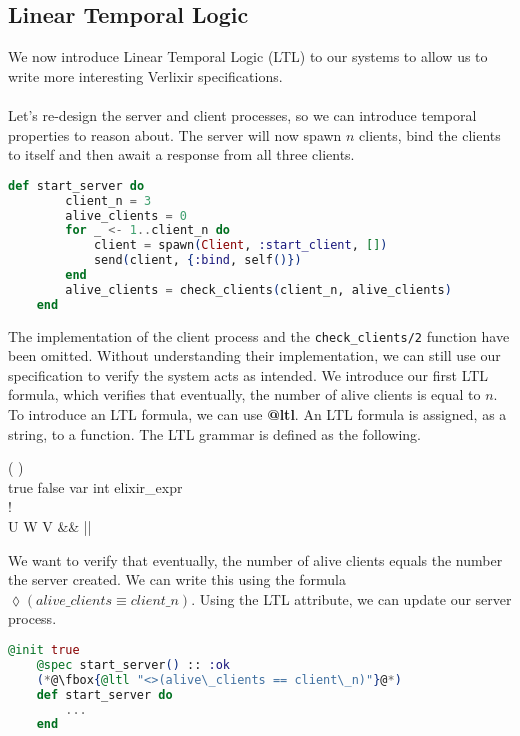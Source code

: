 \subsection{Linear Temporal Logic}
We now introduce Linear Temporal Logic (LTL) to our systems to allow us to write more interesting Verlixir specifications.
\\ \\
Let's re-design the server and client processes, so we can introduce temporal properties to reason about. The server will now spawn $n$ clients, bind the clients to itself and then await a response from all three clients.
\begin{lstlisting}[language=Elixir, xleftmargin=.2\linewidth]
    def start_server do
        client_n = 3
        alive_clients = 0
        for _ <- 1..client_n do
            client = spawn(Client, :start_client, [])
            send(client, {:bind, self()})
        end
        alive_clients = check_clients(client_n, alive_clients)
    end
\end{lstlisting}
The implementation of the client process and the \texttt{check\_clients/2} function have been omitted. Without understanding their implementation, we can still use our specification to verify the system acts as intended. We introduce our first LTL formula, which verifies that eventually, the number of alive clients is equal to $n$. To introduce an LTL formula, we can use \textbf{@ltl}. An LTL formula is assigned, as a string, to a function. The LTL grammar is defined as the following.
\begin{bnf*}
      { \bnfor (  ) \bnfor {}   \bnfor {} }\\
      {true \bnfor false \bnfor var \bnfor int \bnfor elixir\_expr}\\
      {\square \bnfor \lozenge \bnfor !}\\
      {U \bnfor W \bnfor V \bnfor \&\& \bnfor || \bnfor \rightarrow \bnfor \leftrightarrow }\\
\end{bnf*}
We want to verify that eventually, the number of alive clients equals the number the server created. We can write this using the formula $\lozenge (alive\_clients \equiv client\_n)$. Using the LTL attribute, we can update our server process.
\begin{lstlisting}[language=Elixir, xleftmargin=.3\linewidth, caption={Example LTL property}]
    @init true
    @spec start_server() :: :ok
    (*@\fbox{@ltl "<>(alive\_clients == client\_n)"}@*)
    def start_server do
        ...
    end
\end{lstlisting}
